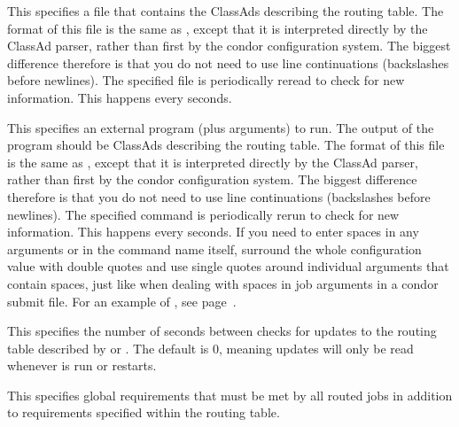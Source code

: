 \begin{description}
\begin{description}
\end{description}

\item[\Macro{JOB\_ROUTER\_ENTRIES\_FILE}] \label{param:JobRouterEntriesFile}
This specifies a file that contains the ClassAds describing the
routing table.  The format of this file is the same as
, except that it is interpreted directly
by the ClassAd parser, rather than first by the condor configuration
system.  The biggest difference therefore is that you do not need to
use line continuations (backslashes before newlines).  The specified
file is periodically reread to check for new information.  This
happens every  seconds.

\item[\Macro{JOB\_ROUTER\_ENTRIES\_CMD}]
\label{param:JobRouterEntriesCmd} This specifies an external program
(plus arguments) to run.  The output of the program should be ClassAds
describing the routing table.  The format of this file is the same as
, except that it is interpreted directly
by the ClassAd parser, rather than first by the condor configuration
system.  The biggest difference therefore is that you do not need to
use line continuations (backslashes before newlines).  The specified
command is periodically rerun to check for new information.  This
happens every  seconds.  If you
need to enter spaces in any arguments or in the command name itself,
surround the whole configuration value with double quotes and use
single quotes around individual arguments that contain spaces, just
like when dealing with spaces in job arguments in a condor submit
file.  For an example of , see
page~\pageref{JobRouterReSSExample}.

\item[\Macro{JOB\_ROUTER\_ENTRIES\_REFRESH}]
\label{param:JobRouterEntriesRefresh} This specifies the number of
seconds between checks for updates to the routing table described by
 or
.  The default is 0, meaning updates
will only be read whenever  is run or
 restarts.

\item[\Macro{JOB\_ROUTER\_SOURCE\_JOB\_CONSTRAINT}]
\label{JobRouterSourceJobConstraint} This specifies global
requirements that must be met by all routed jobs in addition to
requirements specified within the routing table.


\end{description}
